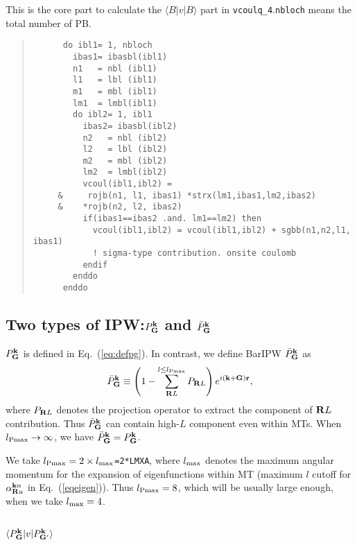 \documentclass[a4paper,10pt,epsf,fleqn]{article}
\newcommand{\bfk}{{\bf k}}
\newcommand{\bfG}{{\bf G}}
\newcommand{\bfR}{{\bf R}}
\newcommand{\req}[1]{\mbox{Eq.~(\ref{#1})}}
\begin{document}
This is the core part to calculate the $\langle B|v|B \rangle$ part
in \verb!vcoulq_4!.\verb!nbloch! means the total number of PB.
\begin{quote}
{\baselineskip=3mm
\begin{verbatim}
      do ibl1= 1, nbloch
        ibas1= ibasbl(ibl1)
        n1   = nbl (ibl1)
        l1   = lbl (ibl1)
        m1   = mbl (ibl1)
        lm1  = lmbl(ibl1)
        do ibl2= 1, ibl1
          ibas2= ibasbl(ibl2)
          n2   = nbl (ibl2)
          l2   = lbl (ibl2)
          m2   = mbl (ibl2)
          lm2  = lmbl(ibl2)
          vcoul(ibl1,ibl2) =
     &     rojb(n1, l1, ibas1) *strx(lm1,ibas1,lm2,ibas2)
     &    *rojb(n2, l2, ibas2)
          if(ibas1==ibas2 .and. lm1==lm2) then
            vcoul(ibl1,ibl2) = vcoul(ibl1,ibl2) + sgbb(n1,n2,l1, ibas1)
            ! sigma-type contribution. onsite coulomb
          endif
        enddo
      enddo
\end{verbatim}}
\end{quote}

\subsection{Two types of IPW:$P^{\bf k}_{{\bf G}}$ and $\bar{P}^{\bf k}_{{\bf G}}$}
$P^{\bf k}_{{\bf G}}$ is defined in \req{eq:defpg}.
In contrast, we define BarIPW $\bar{P}^{\bf k}_{{\bf G}}$ as
\begin{eqnarray}
\bar{P}^{\bf k}_{{\bf G}} \equiv 
\left( 1- \sum_{\bfR{L}}^{l\le l_{\rm Pmax}} {P}_{\bfR{L}} \right) 
e^{i ({\bf k+ G}){\bf r}},
\end{eqnarray}
where ${P}_{\bfR{L}}$ denotes the projection operator 
to extract the component of ${\bfR{L}}$ contribution.
Thus $\bar{P}^{\bf k}_{{\bf G}}$ can contain high-$L$ component
even within MTs.
When $l_{\rm Pmax} \to \infty$, we have 
$\bar{P}^{\bf k}_{{\bf G}}={P}^{\bf k}_{{\bf G}}$.

We take $l_{\rm Pmax} = 2 \times l_{\rm max}$\verb!=2*LMXA!,
where $l_{\rm max}$ denotes the maximum angular momentum 
for the expansion of eigenfunctions within MT (maximum
$l$ cutoff for $\alpha^{{\bfk}n}_{\bfR u}$ in \req{eqeigen}). 
Thus $l_{\rm Pmax}=8$, which will be usually large enough, 
when we take $l_{\rm max}=4$. 


\subsection{$\langle P^\bfk_\bfG |v| P^\bfk_{\bfG'} \rangle$}
\end{document}
